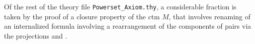 Of the rest of the theory file \verb|Powerset_Axiom.thy|, a
considerable fraction is taken by the proof of a closure property of
the ctm $M$, that involves renaming of an internalized formula
involving a rearrangement of the components of pairs via the
projections  and .


